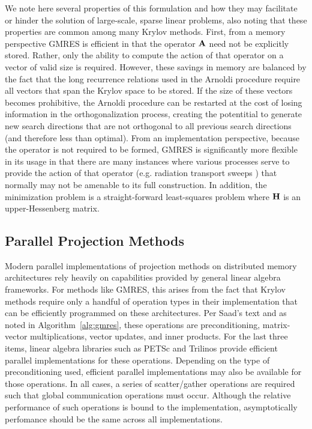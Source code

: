 We note here several properties of this formulation and how they may
facilitate or hinder the solution of large-scale, sparse linear
problems, also noting that these properties are common among many
Krylov methods. First, from a memory perspective GMRES is efficient in
that the operator $\mathbf{A}$ need not be explicitly stored. Rather, only
the ability to compute the action of that operator on a vector of
valid size is required. However, these savings in memory are balanced
by the fact that the long recurrence relations used in the Arnoldi
procedure require all vectors that span the Krylov space to be
stored. If the size of these vectors becomes prohibitive, the Arnoldi
procedure can be restarted at the cost of losing information in the
orthogonalization process, creating the potentitial to generate new
search directions that are not orthogonal to all previous search
directions (and therefore less than optimal). From an implementation
perspective, because the operator is not required to be formed, GMRES
is significantly more flexible in its usage in that there are many
instances where various processes serve to provide the action of that
operator (e.g. radiation transport sweeps \citep{evans_2010}) that
normally may not be amenable to its full construction. In addition,
the minimization problem is a straight-forward least-squares problem
where $\mathbf{H}$ is an upper-Hessenberg matrix.

\subsection{Parallel Projection Methods}
\label{subsec:parallel_krylov_methods}
Modern parallel implementations of projection methods on distributed
memory architectures rely heavily on capabilities provided by general
linear algebra frameworks. For methods like GMRES, this arises from
the fact that Krylov methods require only a handful of operation types
in their implementation that can be efficiently programmed on these
architectures. Per Saad's text \citep{saad_2003} and as noted in
Algorithm~\ref{alg:gmres}, these operations are preconditioning,
matrix-vector multiplications, vector updates, and inner products. For
the last three items, linear algebra libraries such as PETSc
\citep{petsc_2012} and Trilinos \citep{trilinos_2005} provide
efficient parallel implementations for these operations. Depending on
the type of preconditioning used, efficient parallel implementations
may also be available for those operations. In all cases, a series of
scatter/gather operations are required such that global communication
operations must occur. Although the relative performance of such
operations is bound to the implementation, asymptotically perfomance
should be the same across all implementations. 

